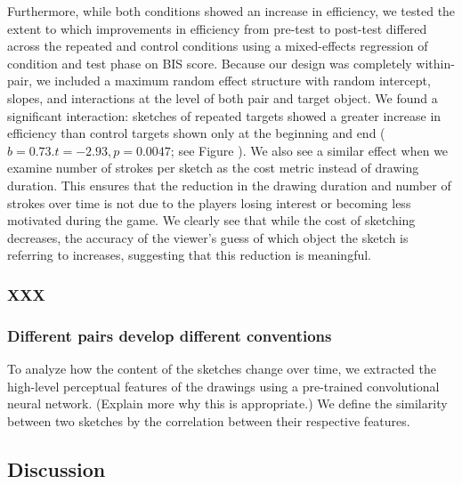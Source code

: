 \documentclass[10pt,letterpaper]{article}
\begin{document}
Furthermore, while both conditions showed an increase in efficiency, we tested the extent to which improvements in efficiency from pre-test to post-test differed across the repeated and control conditions using a mixed-effects regression of condition and test phase on BIS score. Because our design was completely within-pair, we included a maximum random effect structure with random intercept, slopes, and interactions at the level of both pair and target object. We found a significant interaction: sketches of repeated targets showed a greater increase in efficiency than control targets shown only at the beginning and end ($b = 0.73. t = -2.93, p = 0.0047$; see Figure ). We also see a similar effect when we examine number of strokes per sketch as the cost metric instead of drawing duration. This ensures that the reduction in the drawing duration and number of strokes over time is not due to the players losing interest or becoming less motivated during the game. We clearly see that while the cost of sketching decreases, the accuracy of the viewer's guess of which object the sketch is referring to increases, suggesting that this reduction is meaningful. 





\subsubsection{XXX}

\subsubsection{Different pairs develop different conventions} To analyze how the content of the sketches change over time, we extracted the high-level perceptual features of the drawings using a pre-trained convolutional neural network. (Explain more why this is appropriate.) We define the similarity between two sketches by the correlation between their respective features.%


\subsection{Discussion}
\end{document}
